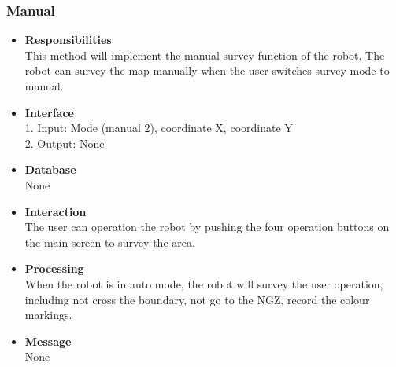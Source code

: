\documentclass[11pt, a4paper]{article}
\begin{document}
\subsubsection{Manual}
\begin{itemize}
\item {\bfseries Responsibilities }\\
This method will implement the manual survey function of the robot. The robot can survey the map manually when the user switches survey mode to manual.\\

\item {\bfseries Interface }\\
1. Input: Mode (manual 2), coordinate X, coordinate Y\\
2. Output: None\\

\item {\bfseries Database }\\
None

\item {\bfseries Interaction }\\
The user can operation the robot by pushing the four operation buttons on the main screen to survey the area.\\

\item {\bfseries Processing }\\
When the robot is in auto mode, the robot will survey the user operation, including not cross the boundary, not go to the NGZ, record the colour markings.\\

\item {\bfseries Message }\\
None
\end{itemize}

\end{document}
